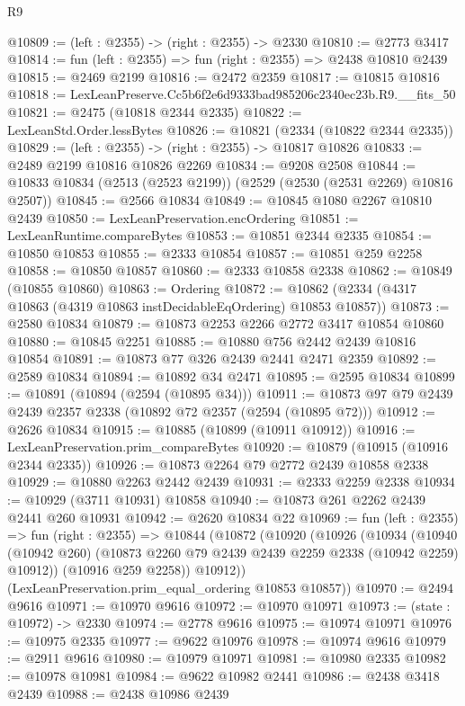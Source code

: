 \begin{lexlean}{R9}
\begin{coremodule}
@10809 := (left : @2355) -> (right : @2355) -> @2330
@10810 := @2773 @3417
@10814 := fun (left : @2355) => fun (right : @2355) => @2438 @10810 @2439
@10815 := @2469 @2199
@10816 := @2472 @2359
@10817 := @10815 @10816
@10818 := LexLeanPreserve.Cc5b6f2e6d9333bad985206c2340ec23b.R9.__fits_50
@10821 := @2475 (@10818 @2344 @2335)
@10822 := LexLeanStd.Order.lessBytes
@10826 := @10821 (@2334 (@10822 @2344 @2335))
@10829 := (left : @2355) -> (right : @2355) -> @10817 @10826
@10833 := @2489 @2199 @10816 @10826 @2269
@10834 := @9208 @2508
@10844 := @10833 @10834 (@2513 (@2523 @2199)) (@2529 (@2530 (@2531 @2269) @10816 @2507))
@10845 := @2566 @10834
@10849 := @10845 @1080 @2267 @10810 @2439
@10850 := LexLeanPreservation.encOrdering
@10851 := LexLeanRuntime.compareBytes
@10853 := @10851 @2344 @2335
@10854 := @10850 @10853
@10855 := @2333 @10854
@10857 := @10851 @259 @2258
@10858 := @10850 @10857
@10860 := @2333 @10858 @2338
@10862 := @10849 (@10855 @10860)
@10863 := Ordering
@10872 := @10862 (@2334 (@4317 @10863 (@4319 @10863 instDecidableEqOrdering) @10853 @10857))
@10873 := @2580 @10834
@10879 := @10873 @2253 @2266 @2772 @3417 @10854 @10860
@10880 := @10845 @2251
@10885 := @10880 @756 @2442 @2439 @10816 @10854
@10891 := @10873 @77 @326 @2439 @2441 @2471 @2359
@10892 := @2589 @10834
@10894 := @10892 @34 @2471
@10895 := @2595 @10834
@10899 := @10891 (@10894 (@2594 (@10895 @34)))
@10911 := @10873 @97 @79 @2439 @2439 @2357 @2338 (@10892 @72 @2357 (@2594 (@10895 @72)))
@10912 := @2626 @10834
@10915 := @10885 (@10899 (@10911 @10912))
@10916 := LexLeanPreservation.prim_compareBytes
@10920 := @10879 (@10915 (@10916 @2344 @2335))
@10926 := @10873 @2264 @79 @2772 @2439 @10858 @2338
@10929 := @10880 @2263 @2442 @2439
@10931 := @2333 @2259 @2338
@10934 := @10929 (@3711 @10931) @10858
@10940 := @10873 @261 @2262 @2439 @2441 @260 @10931
@10942 := @2620 @10834 @22
@10969 := fun (left : @2355) =>
  fun (right : @2355) =>
  @10844
    (@10872
      (@10920
        (@10926
          (@10934
            (@10940 (@10942 @260) (@10873 @2260 @79 @2439 @2439 @2259 @2338 (@10942 @2259) @10912))
            (@10916 @259 @2258))
          @10912))
      (LexLeanPreservation.prim_equal_ordering @10853 @10857))
@10970 := @2494 @9616
@10971 := @10970 @9616
@10972 := @10970 @10971
@10973 := (state : @10972) -> @2330
@10974 := @2778 @9616
@10975 := @10974 @10971
@10976 := @10975 @2335
@10977 := @9622 @10976
@10978 := @10974 @9616
@10979 := @2911 @9616
@10980 := @10979 @10971
@10981 := @10980 @2335
@10982 := @10978 @10981
@10984 := @9622 @10982 @2441
@10986 := @2438 @3418 @2439
@10988 := @2438 @10986 @2439

\end{coremodule}
\end{lexlean}
